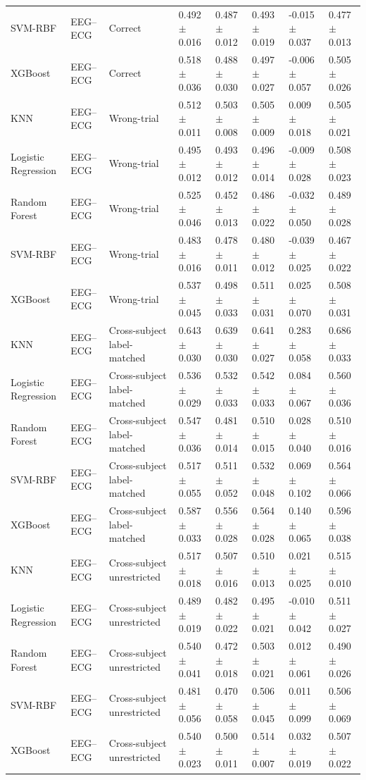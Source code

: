 \begin{table}[!t]
\begin{tabular}{llllllll}
SVM-RBF & EEG--ECG & Correct & 0.492 $\pm$ 0.016 & 0.487 $\pm$ 0.012 & 0.493 $\pm$ 0.019 & -0.015 $\pm$ 0.037 & 0.477 $\pm$ 0.013 \\
XGBoost & EEG--ECG & Correct & 0.518 $\pm$ 0.036 & 0.488 $\pm$ 0.030 & 0.497 $\pm$ 0.027 & -0.006 $\pm$ 0.057 & 0.505 $\pm$ 0.026 \\
KNN & EEG--ECG & Wrong-trial & 0.512 $\pm$ 0.011 & 0.503 $\pm$ 0.008 & 0.505 $\pm$ 0.009 & 0.009 $\pm$ 0.018 & 0.505 $\pm$ 0.021 \\
Logistic Regression & EEG--ECG & Wrong-trial & 0.495 $\pm$ 0.012 & 0.493 $\pm$ 0.012 & 0.496 $\pm$ 0.014 & -0.009 $\pm$ 0.028 & 0.508 $\pm$ 0.023 \\
Random Forest & EEG--ECG & Wrong-trial & 0.525 $\pm$ 0.046 & 0.452 $\pm$ 0.013 & 0.486 $\pm$ 0.022 & -0.032 $\pm$ 0.050 & 0.489 $\pm$ 0.028 \\
SVM-RBF & EEG--ECG & Wrong-trial & 0.483 $\pm$ 0.016 & 0.478 $\pm$ 0.011 & 0.480 $\pm$ 0.012 & -0.039 $\pm$ 0.025 & 0.467 $\pm$ 0.022 \\
XGBoost & EEG--ECG & Wrong-trial & 0.537 $\pm$ 0.045 & 0.498 $\pm$ 0.033 & 0.511 $\pm$ 0.031 & 0.025 $\pm$ 0.070 & 0.508 $\pm$ 0.031 \\
KNN & EEG--ECG & Cross-subject label-matched & 0.643 $\pm$ 0.030 & 0.639 $\pm$ 0.030 & 0.641 $\pm$ 0.027 & 0.283 $\pm$ 0.058 & 0.686 $\pm$ 0.033 \\
Logistic Regression & EEG--ECG & Cross-subject label-matched & 0.536 $\pm$ 0.029 & 0.532 $\pm$ 0.033 & 0.542 $\pm$ 0.033 & 0.084 $\pm$ 0.067 & 0.560 $\pm$ 0.036 \\
Random Forest & EEG--ECG & Cross-subject label-matched & 0.547 $\pm$ 0.036 & 0.481 $\pm$ 0.014 & 0.510 $\pm$ 0.015 & 0.028 $\pm$ 0.040 & 0.510 $\pm$ 0.016 \\
SVM-RBF & EEG--ECG & Cross-subject label-matched & 0.517 $\pm$ 0.055 & 0.511 $\pm$ 0.052 & 0.532 $\pm$ 0.048 & 0.069 $\pm$ 0.102 & 0.564 $\pm$ 0.066 \\
XGBoost & EEG--ECG & Cross-subject label-matched & 0.587 $\pm$ 0.033 & 0.556 $\pm$ 0.028 & 0.564 $\pm$ 0.028 & 0.140 $\pm$ 0.065 & 0.596 $\pm$ 0.038 \\
KNN & EEG--ECG & Cross-subject unrestricted & 0.517 $\pm$ 0.018 & 0.507 $\pm$ 0.016 & 0.510 $\pm$ 0.013 & 0.021 $\pm$ 0.025 & 0.515 $\pm$ 0.010 \\
Logistic Regression & EEG--ECG & Cross-subject unrestricted & 0.489 $\pm$ 0.019 & 0.482 $\pm$ 0.022 & 0.495 $\pm$ 0.021 & -0.010 $\pm$ 0.042 & 0.511 $\pm$ 0.027 \\
Random Forest & EEG--ECG & Cross-subject unrestricted & 0.540 $\pm$ 0.041 & 0.472 $\pm$ 0.018 & 0.503 $\pm$ 0.021 & 0.012 $\pm$ 0.061 & 0.490 $\pm$ 0.026 \\
SVM-RBF & EEG--ECG & Cross-subject unrestricted & 0.481 $\pm$ 0.056 & 0.470 $\pm$ 0.058 & 0.506 $\pm$ 0.045 & 0.011 $\pm$ 0.099 & 0.506 $\pm$ 0.069 \\
XGBoost & EEG--ECG & Cross-subject unrestricted & 0.540 $\pm$ 0.023 & 0.500 $\pm$ 0.011 & 0.514 $\pm$ 0.007 & 0.032 $\pm$ 0.019 & 0.507 $\pm$ 0.022 \\
\bottomrule
\end{tabular}
\end{table}